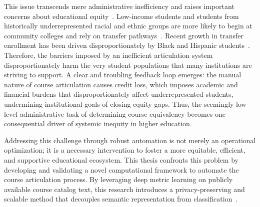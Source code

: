 This issue transcends mere administrative inefficiency and raises important concerns about educational equity~\cite{collegeopportunity2017}. Low-income students and students from historically underrepresented racial and ethnic groups are more likely to begin at community colleges and rely on transfer pathways~\cite{ace2025}. Recent growth in transfer enrollment has been driven disproportionately by Black and Hispanic students~\cite{nscnews2023}. Therefore, the barriers imposed by an inefficient articulation system disproportionately harm the very student populations that many institutions are striving to support. A clear and troubling feedback loop emerges: the manual nature of course articulation causes credit loss, which imposes academic and financial burdens that disproportionately affect underrepresented students, undermining institutional goals of closing equity gaps. Thus, the seemingly low-level administrative task of determining course equivalency becomes one consequential driver of systemic inequity in higher education.

Addressing this challenge through robust automation is not merely an operational optimization; it is a necessary intervention to foster a more equitable, efficient, and supportive educational ecosystem. This thesis confronts this problem by developing and validating a novel computational framework to automate the course articulation process. By leveraging deep metric learning on publicly available course catalog text, this research introduces a privacy-preserving and scalable method that decouples semantic representation from classification~\cite{sym11091066}.


